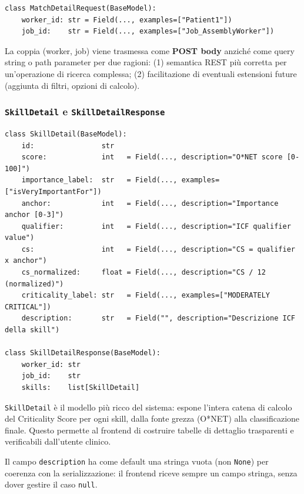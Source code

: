 \documentclass[a4paper,12pt]{article}
\begin{document}
\begin{lstlisting}[caption={Request body per \texttt{POST /match/detail}.}]
class MatchDetailRequest(BaseModel):
    worker_id: str = Field(..., examples=["Patient1"])
    job_id:    str = Field(..., examples=["Job_AssemblyWorker"])
\end{lstlisting}

\noindent La coppia (worker, job) viene trasmessa come \textbf{POST body} anzich\'{e}
come query string o path parameter per due ragioni: (1) semantica REST
pi\`{u} corretta per un'operazione di ricerca complessa; (2) facilitazione
di eventuali estensioni future (aggiunta di filtri, opzioni di calcolo).

\subsubsection{\texttt{SkillDetail} e \texttt{SkillDetailResponse}}

\begin{lstlisting}[caption={\texttt{SkillDetail} --- dettaglio per singola skill (Q3).}]
class SkillDetail(BaseModel):
    id:                str
    score:             int   = Field(..., description="O*NET score [0-100]")
    importance_label:  str   = Field(..., examples=["isVeryImportantFor"])
    anchor:            int   = Field(..., description="Importance anchor [0-3]")
    qualifier:         int   = Field(..., description="ICF qualifier value")
    cs:                int   = Field(..., description="CS = qualifier x anchor")
    cs_normalized:     float = Field(..., description="CS / 12 (normalized)")
    criticality_label: str   = Field(..., examples=["MODERATELY CRITICAL"])
    description:       str   = Field("", description="Descrizione ICF della skill")

class SkillDetailResponse(BaseModel):
    worker_id: str
    job_id:    str
    skills:    list[SkillDetail]
\end{lstlisting}

\noindent \texttt{SkillDetail} \`{e} il modello pi\`{u} ricco del sistema: espone
l'intera catena di calcolo del Criticality Score per ogni skill, dalla
fonte grezza (O*NET) alla classificazione finale. Questo permette al
frontend di costruire tabelle di dettaglio trasparenti e verificabili
dall'utente clinico.

Il campo \texttt{description} ha come default una stringa vuota (non
\texttt{None}) per coerenza con la serializzazione: il frontend
riceve sempre un campo stringa, senza dover gestire il caso
\texttt{null}.
\end{document}
